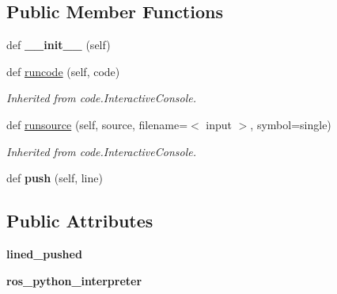 \subsection*{Public Member Functions}
\begin{DoxyCompactItemize}
\item 
\mbox{\label{classros_1_1shell__client_1_1DynamicGraphInteractiveConsole_a55c1e79124ad87114bd27c5f1b7550bf}} 
def {\bfseries \+\_\+\+\_\+init\+\_\+\+\_\+} (self)
\item 
def \hyperlink{classros_1_1shell__client_1_1DynamicGraphInteractiveConsole_ae2781aac94d439abbdc158961562342f}{runcode} (self, code)
\begin{DoxyCompactList}\small\item\em Inherited from code.\+Interactive\+Console. \end{DoxyCompactList}\item 
def \hyperlink{classros_1_1shell__client_1_1DynamicGraphInteractiveConsole_afe6b432e407d107434ccc105a99f7746}{runsource} (self, source, filename=\textquotesingle{}$<$ input $>$\textquotesingle{}, symbol=\textquotesingle{}single\textquotesingle{})
\begin{DoxyCompactList}\small\item\em Inherited from code.\+Interactive\+Console. \end{DoxyCompactList}\item 
\mbox{\label{classros_1_1shell__client_1_1DynamicGraphInteractiveConsole_aa7e3a07d2def8b5266cb5925bb049d9f}} 
def {\bfseries push} (self, line)
\end{DoxyCompactItemize}
\subsection*{Public Attributes}
\begin{DoxyCompactItemize}
\item 
\mbox{\label{classros_1_1shell__client_1_1DynamicGraphInteractiveConsole_a77621fd2201b8806aa151e249246e47a}} 
{\bfseries lined\+\_\+pushed}
\item 
\mbox{\label{classros_1_1shell__client_1_1DynamicGraphInteractiveConsole_ad84d4c48a16b1fe47a923a02acdd41c3}} 
{\bfseries ros\+\_\+python\+\_\+interpreter}
\end{DoxyCompactItemize}


